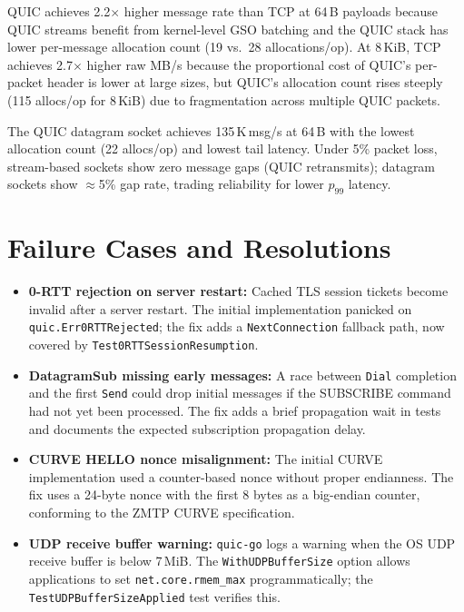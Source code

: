 \documentclass[12pt, a4paper, oneside]{report}
\begin{document}
QUIC achieves 2.2$\times$ higher message rate than TCP at 64\,B payloads because QUIC streams benefit from kernel-level GSO batching and the QUIC stack has lower per-message allocation count (19 vs.\ 28 allocations/op). At 8\,KiB, TCP achieves 2.7$\times$ higher raw MB/s because the proportional cost of QUIC's per-packet header is lower at large sizes, but QUIC's allocation count rises steeply (115 allocs/op for 8\,KiB) due to fragmentation across multiple QUIC packets.

The QUIC datagram socket achieves 135\,K\,msg/s at 64\,B with the lowest allocation count (22 allocs/op) and lowest tail latency. Under 5\% packet loss, stream-based sockets show zero message gaps (QUIC retransmits); datagram sockets show $\approx$5\% gap rate, trading reliability for lower $p_{99}$ latency.

\section{Failure Cases and Resolutions}
\label{sec:failures}

\begin{itemize}
  \item \textbf{0-RTT rejection on server restart:} Cached TLS session tickets become invalid after a server restart. The initial implementation panicked on \texttt{quic.Err0RTTRejected}; the fix adds a \texttt{NextConnection} fallback path, now covered by \texttt{Test0RTTSessionResumption}.

  \item \textbf{DatagramSub missing early messages:} A race between \texttt{Dial} completion and the first \texttt{Send} could drop initial messages if the SUBSCRIBE command had not yet been processed. The fix adds a brief propagation wait in tests and documents the expected subscription propagation delay.

  \item \textbf{CURVE HELLO nonce misalignment:} The initial CURVE implementation used a counter-based nonce without proper endianness. The fix uses a 24-byte nonce with the first 8 bytes as a big-endian counter, conforming to the ZMTP CURVE specification.

  \item \textbf{UDP receive buffer warning:} \texttt{quic-go} logs a warning when the OS UDP receive buffer is below 7\,MiB. The \texttt{WithUDPBufferSize} option allows applications to set \texttt{net.core.rmem\_max} programmatically; the \texttt{TestUDPBufferSizeApplied} test verifies this.
\end{itemize}
\end{document}
